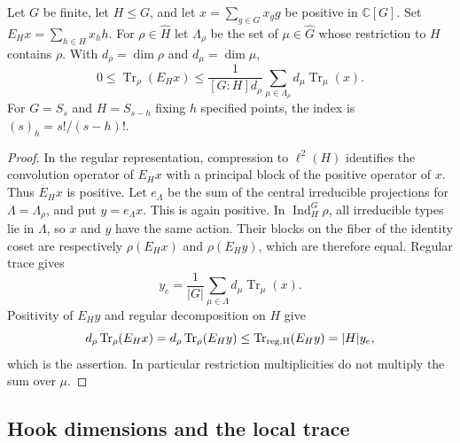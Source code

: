 \begin{lemma}
\label{lem:pointwise-positive-restriction}
Let $G$ be finite, let $H\le G$, and let $x=\sum_{g\in G}x_g g$
be positive in $\mathbb C[G]$. Set $E_Hx=\sum_{h\in H}x_hh$.
For $\rho\in\widehat H$ let $\Lambda_\rho$ be the set of
$\mu\in\widehat G$ whose restriction to $H$ contains $\rho$.
With $d_\rho=\dim\rho$ and $d_\mu=\dim\mu$,
\begin{equation}
 0\le\operatorname{Tr}_\rho(E_Hx)
 \le\frac1{[G:H]d_\rho}
       \sum_{\mu\in\Lambda_\rho}d_\mu\operatorname{Tr}_\mu(x).
 \label{eq:pointwise-positive-restriction}
\end{equation}
For $G=S_s$ and $H=S_{s-h}$ fixing $h$ specified points, the index
is $(s)_h=s!/(s-h)!$.
\end{lemma}
\begin{proof}
In the regular representation, compression to $\ell^2(H)$ identifies
the convolution operator of $E_Hx$ with a principal block of the
positive operator of $x$. Thus $E_Hx$ is positive.
Let $e_\Lambda$ be the sum of the central irreducible projections
for $\Lambda=\Lambda_\rho$, and put $y=e_\Lambda x$. This is again
positive. In $\operatorname{Ind}_H^G\rho$, all irreducible types lie
in $\Lambda$, so $x$ and $y$ have the same action. Their blocks on
the fiber of the identity coset are respectively $\rho(E_Hx)$ and
$\rho(E_Hy)$, which are therefore equal. Regular trace gives
\[
 y_e=\frac1{|G|}\sum_{\mu\in\Lambda}
                 d_\mu\operatorname{Tr}_\mu(x).
\]
Positivity of $E_Hy$ and regular decomposition on $H$ give
\[
 d_\rho\operatorname{Tr}_\rho(E_Hx)
 =d_\rho\operatorname{Tr}_\rho(E_Hy)
 \le\operatorname{Tr}_{\rm reg,H}(E_Hy)=|H|y_e,
\]
which is the assertion. In particular restriction multiplicities
do not multiply the sum over $\mu$.
\end{proof}

\subsection{Hook dimensions and the local trace}

